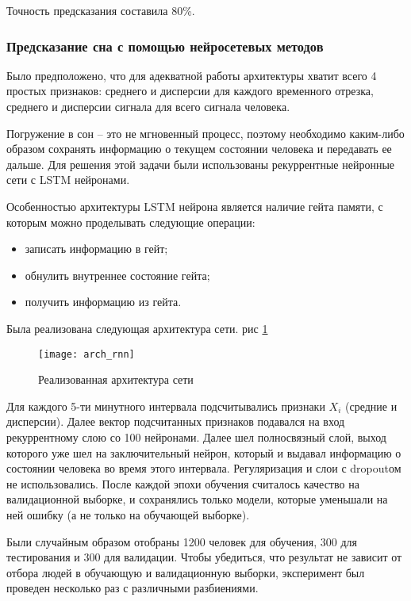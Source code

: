 Точность предсказания составила 80\%.

\subsubsection{Предсказание сна с помощью нейросетевых методов}

Было предположено, что для адекватной работы архитектуры хватит всего 4 простых признаков: среднего и дисперсии для каждого временного отрезка, среднего и дисперсии сигнала для всего сигнала человека.

Погружение в сон -- это не мгновенный процесс, поэтому необходимо каким-либо образом сохранять информацию о текущем состоянии человека и передавать ее дальше. Для решения этой задачи были использованы рекуррентные нейронные сети с LSTM нейронами. 

Особенностью архитектуры LSTM нейрона является наличие гейта памяти, с которым можно проделывать следующие операции:

\begin{itemize}
	\item записать информацию в гейт;
	\item обнулить внутреннее состояние гейта;
	\item получить информацию из гейта.
\end{itemize}

Была реализована следующая архитектура сети. рис \ref{ris:arh_rnn}

\begin{figure}[h]
	\begin{center}
		\texttt{[image: arch\_rnn]}
		\caption{Реализованная архитектура сети}
		\label{ris:arh_rnn}
	\end{center}
\end{figure}

Для каждого 5-ти минутного интервала подсчитывались признаки $X_i$ (средние и дисперсии). Далее вектор подсчитанных признаков подавался на вход рекуррентному слою со 100 нейронами. Далее шел полносвязный слой, выход которого уже шел на заключительный нейрон, который и выдавал информацию о состоянии человека во время этого интервала. Регуляризация и слои с dropoutом не использовались. После каждой эпохи обучения считалось качество на валидационной выборке, и сохранялись только модели, которые уменьшали на ней ошибку (а не только на обучающей выборке). 

Были случайным образом отобраны 1200 человек для обучения, 300 для тестирования и 300 для валидации. 
Чтобы убедиться, что результат не зависит от отбора людей в обучающую и валидационную выборки, эксперимент был проведен несколько раз с различными разбиениями.

